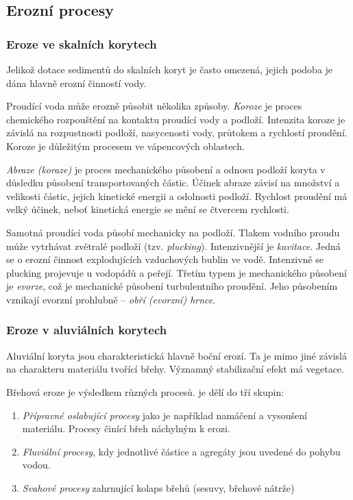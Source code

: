 
\subsection{Erozní procesy}

\subsubsection{Eroze ve skalních korytech}
Jelikož dotace sedimentů do skalních koryt je často omezená, jejich podoba je dána hlavně erozní činností vody. 

Proudící voda může erozně působit několika způsoby. \emph{Koroze} je proces chemického rozpouštění na kontaktu proudící vody a podloží. Intenzita koroze je závislá na rozpustnosti podloží, nasycenosti vody, průtokem a rychlostí proudění. Koroze je důležitým procesem ve vápencových oblastech.

\emph{Abraze (koraze)} je proces mechanického působení a odnosu podloží koryta v důsledku působení transportovaných částic. Účinek abraze závisí na množství a velikosti částic, jejich kinetické energii a odolnosti podloží. Rychlost proudění má velký účinek, neboť kinetická energie se mění se čtvercem rychlosti. 

Samotná proudící voda působí mechanicky na podloží. Tlakem vodního proudu může vytrhávat zvětralé podloží (tzv. \emph{plucking}). Intenzivnější je \emph{kavitace}. Jedná se o erozní činnost explodujících vzduchových bublin ve vodě. Intenzivně se plucking projevuje u vodopádů a peřejí. Třetím typem je mechanického působení je \emph{evorze}, což je mechanické působení turbulentního proudění. Jeho působením vznikají evorzní prohlubně -- \emph{obří (evorzní) hrnce}.

\subsubsection{Eroze v aluviálních korytech}
Aluviální koryta jsou charakteristická hlavně boční erozí. Ta je mimo jiné závislá na charakteru materiálu tvořící břehy. Významný stabilizační efekt má vegetace.

Břehová eroze je výsledkem různých procesů. \textcite{charltonFundamentalsFluvialGeomorphology2007} je dělí do tří skupin:
\begin{enumerate}
	\item \emph{Přípravné oslabující procesy} jako je například namáčení a vysoušení materiálu. Procesy činící břeh náchylným k erozi.
	\item \emph{Fluviální procesy}, kdy jednotlivé částice a agregáty jsou uvedené do pohybu vodou.
	\item \emph{Svahové procesy} zahrnující kolaps břehů (sesuvy, břehové nátrže)
\end{enumerate}

